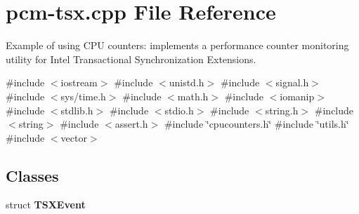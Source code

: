 \section{pcm-\/tsx.cpp File Reference}
\label{pcm-tsx_8cpp}


Example of using C\+PU counters\+: implements a performance counter monitoring utility for Intel Transactional Synchronization Extensions.  


{\ttfamily \#include $<$iostream$>$}\newline
{\ttfamily \#include $<$unistd.\+h$>$}\newline
{\ttfamily \#include $<$signal.\+h$>$}\newline
{\ttfamily \#include $<$sys/time.\+h$>$}\newline
{\ttfamily \#include $<$math.\+h$>$}\newline
{\ttfamily \#include $<$iomanip$>$}\newline
{\ttfamily \#include $<$stdlib.\+h$>$}\newline
{\ttfamily \#include $<$stdio.\+h$>$}\newline
{\ttfamily \#include $<$string.\+h$>$}\newline
{\ttfamily \#include $<$string$>$}\newline
{\ttfamily \#include $<$assert.\+h$>$}\newline
{\ttfamily \#include \char`\"{}cpucounters.\+h\char`\"{}}\newline
{\ttfamily \#include \char`\"{}utils.\+h\char`\"{}}\newline
{\ttfamily \#include $<$vector$>$}\newline
\subsection*{Classes}
\begin{DoxyCompactItemize}
\item 
struct \textbf{ T\+S\+X\+Event}
\end{DoxyCompactItemize}

